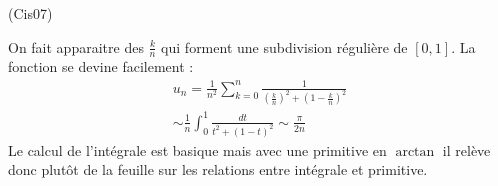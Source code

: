 \begin{tiny}(Cis07)\end{tiny} On fait apparaitre des $\frac{k}{n}$ qui forment une subdivision régulière de $[0,1]$. La fonction se devine facilement :
\begin{multline*}
 u_n
=\frac{1}{n^2}\sum_{k=0}^n \frac{1}{(\frac{k}{n})^2+(1-\frac{k}{n})^2}\\
\sim \frac{1}{n}\int_0^1\frac{dt}{t^2+(1-t)^2}
\sim \frac{\pi}{2n}
\end{multline*}
Le calcul de l'intégrale est basique mais avec une primitive en $\arctan$ il relève donc plutôt de la feuille sur les relations entre intégrale et primitive.